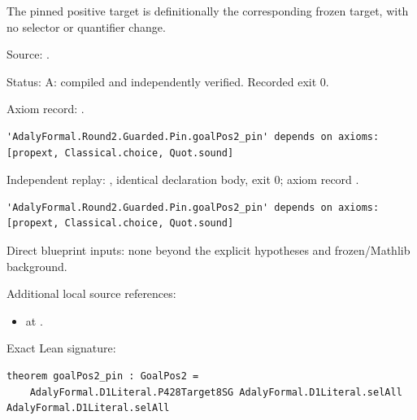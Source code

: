 \begin{theorem}[bp-244]
\label{bp-244}
\uses{}
\leanok
The pinned positive target is definitionally the corresponding frozen target, with no selector or quantifier change.

\par Source: \texttt{}.
\par Status: A: compiled and independently verified. Recorded exit 0.
\par Axiom record: \texttt{}.
\begin{verbatim}
'AdalyFormal.Round2.Guarded.Pin.goalPos2_pin' depends on axioms: [propext, Classical.choice, Quot.sound]
\end{verbatim}
\par Independent replay: \texttt{}, identical declaration body, exit 0; axiom record \texttt{}.
\begin{verbatim}
'AdalyFormal.Round2.Guarded.Pin.goalPos2_pin' depends on axioms: [propext, Classical.choice, Quot.sound]
\end{verbatim}
\par Direct blueprint inputs: none beyond the explicit hypotheses and frozen/Mathlib background.
\par Additional local source references:
\begin{itemize}
\item \texttt{} at \texttt{}.
\end{itemize}
\par Exact Lean signature:
\begin{verbatim}
theorem goalPos2_pin : GoalPos2 =
    AdalyFormal.D1Literal.P428Target8SG AdalyFormal.D1Literal.selAll AdalyFormal.D1Literal.selAll
\end{verbatim}
\end{theorem}

